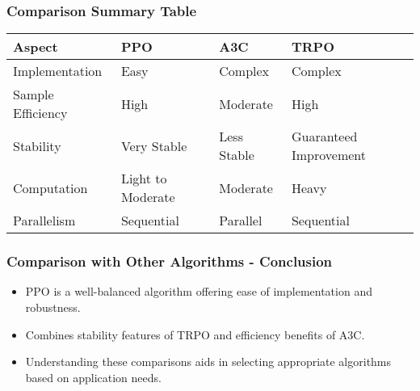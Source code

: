 \documentclass{beamer}
\begin{document}
\begin{frame}[fragile]
    \frametitle{Comparison Summary Table}
    \begin{table}[htbp]
        \centering
        \begin{tabular}{|l|l|l|l|}
            \hline
            \textbf{Aspect}       & \textbf{PPO}                  & \textbf{A3C}                & \textbf{TRPO}               \\ \hline
            Implementation        & Easy                         & Complex                     & Complex                     \\ \hline
            Sample Efficiency     & High                         & Moderate                    & High                        \\ \hline
            Stability             & Very Stable                  & Less Stable                 & Guaranteed Improvement       \\ \hline
            Computation           & Light to Moderate            & Moderate                    & Heavy                       \\ \hline
            Parallelism           & Sequential                   & Parallel                    & Sequential                  \\ \hline
        \end{tabular}
    \end{table}
\end{frame}

\begin{frame}[fragile]
    \frametitle{Comparison with Other Algorithms - Conclusion}
    \begin{itemize}
        \item PPO is a well-balanced algorithm offering ease of implementation and robustness.
        \item Combines stability features of TRPO and efficiency benefits of A3C.
        \item Understanding these comparisons aids in selecting appropriate algorithms based on application needs.
    \end{itemize}
\end{frame}
\end{document}
